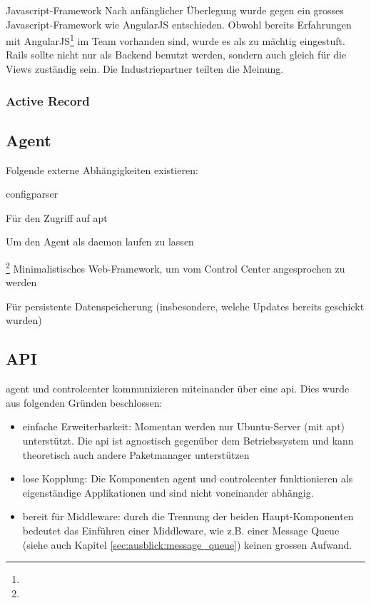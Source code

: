 \begin{decision}{Javascript-Framework}
Nach anfänglicher Überlegung wurde gegen ein grosses Javascript-Framework wie AngularJS entschieden. Obwohl bereits Erfahrungen mit AngularJS\footnote{} im Team vorhanden sind, wurde es als zu mächtig eingestuft. Rails sollte nicht nur als Backend benutzt werden, sondern auch gleich für die Views zuständig sein. Die Industriepartner teilten die Meinung. 
\end{decision}

\subsubsection*{Active Record}


\subsection*{Agent}

\xxx

Folgende externe Abhängigkeiten existieren:

\begin{labeling}{configparser}
    \item [apt] Für den Zugriff auf \gls{apt}
    \item [daemonize] Um den Agent als \gls{daemon} laufen zu lassen
    \item [configparser]
    \item [bottle]\footnote{} Minimalistisches Web-Framework, um vom Control Center angesprochen zu werden
    \item [shelve] Für persistente Datenspeicherung (insbesondere, welche Updates bereits geschickt wurden)
\end{labeling}

\subsection*{API}
\label{sec:architecture:api}

\gls{agent} und \gls{controlcenter} kommunizieren miteinander über eine \gls{api}. Dies wurde aus folgenden Gründen beschlossen:

\begin{itemize}
    \item einfache Erweiterbarkeit: Momentan werden nur Ubuntu-Server (mit \gls{apt}) unterstützt. Die \gls{api} ist agnostisch gegenüber dem Betriebssystem und kann theoretisch auch andere Paketmanager unterstützen
    \item lose Kopplung: Die Komponenten \gls{agent} und \gls{controlcenter} funktionieren als eigenständige Applikationen und sind nicht voneinander abhängig.
    \item bereit für Middleware: durch die Trennung der beiden Haupt-Komponenten bedeutet das Einführen einer Middleware, wie z.B. einer Message Queue (siehe auch Kapitel \ref{sec:ausblick:message_queue}) keinen grossen Aufwand.
\end{itemize}

